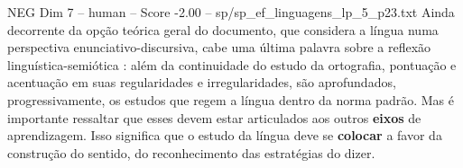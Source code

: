 \begin{textsample}{NEG Dim 7 – human – Score -2.00 – sp/sp\_ef\_linguagens\_lp\_5\_p23.txt}  \label{ex:f7_neg_005}
Ainda decorrente da opção teórica geral do documento, que considera a língua numa perspectiva enunciativo-discursiva, cabe uma última palavra sobre a reflexão linguística-semiótica : além da continuidade do estudo da ortografia, pontuação e acentuação em suas regularidades e irregularidades, são aprofundados, progressivamente, os estudos que regem a língua dentro da norma padrão.
Mas é importante ressaltar que esses devem estar articulados aos outros \textbf{eixos} de aprendizagem.
Isso significa que o estudo da língua deve se \textbf{colocar} a favor da construção do sentido, do reconhecimento das estratégias do dizer.

\end{textsample}
